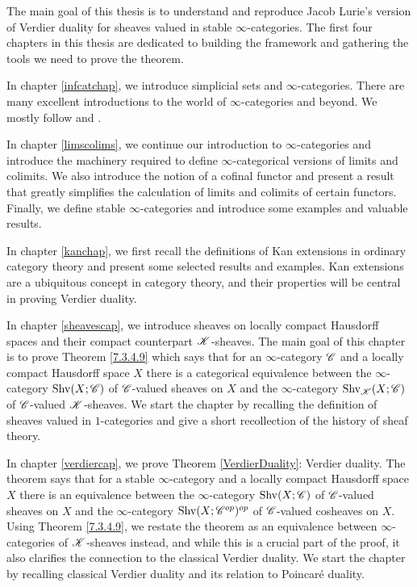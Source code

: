 \documentclass[../../thesis.tex]{subfiles}
\begin{document}
The main goal of this thesis is to understand and reproduce Jacob Lurie's version of Verdier duality for sheaves valued in stable $\infty$-categories.
The first four chapters in this thesis are dedicated to building the framework and gathering the tools we need to prove the theorem.


In chapter \ref{infcatchap}, we introduce simplicial sets and $\infty$-categories.
There are many excellent introductions to the world of $\infty$-categories and beyond.
We mostly follow \cite{kerodon} and \cite{Rezk}.


In chapter \ref{limscolims}, we continue our introduction to $\infty$-categories and introduce the machinery required to define $\infty$-categorical versions of limits and colimits.
We also introduce the notion of a cofinal functor and present a result that greatly simplifies the calculation of limits and colimits of certain functors.
Finally, we define stable $\infty$-categories and introduce some examples and valuable results.


In chapter \ref{kanchap}, we first recall the definitions of Kan extensions in ordinary category theory and present some selected results and examples.
Kan extensions are a ubiquitous concept in category theory, and their properties will be central in proving Verdier duality.


In chapter \ref{sheavescap}, we introduce sheaves on locally compact Hausdorff spaces and their compact counterpart $\mathscr{K}$-sheaves.
The main goal of this chapter is to prove Theorem \ref{7.3.4.9} which says that for an $\infty$-category $\mathscr{C}$ and a locally compact Hausdorff space $X$ there is a categorical equivalence between the $\infty$-category $\mathrm{Shv}(X;\mathscr{C})$ of $\mathscr{C}$-valued sheaves on $X$ and the $\infty$-category $\mathrm{Shv}_{\mathscr{K}}(X;\mathscr{C})$ of $\mathscr{C}$-valued $\mathscr{K}$-sheaves.
We start the chapter by recalling the definition of sheaves valued in $1$-categories and give a short recollection of the history of sheaf theory.

In chapter \ref{verdiercap}, we prove Theorem \ref{VerdierDuality}: Verdier duality.
The theorem says that for a stable $\infty$-category and a locally compact Hausdorff space $X$ there is an equivalence between the $\infty$-category $\mathrm{Shv}(X;\mathscr{C})$ of $\mathscr{C}$-valued sheaves on $X$ and the $\infty$-category $\mathrm{Shv}(X;\mathscr{C}^{op})^{op}$ of $\mathscr{C}$-valued cosheaves on $X$.
Using Theorem \ref{7.3.4.9}, we restate the theorem as an equivalence between $\infty$-categories of $\mathscr{K}$-sheaves instead, and while this is a crucial part of the proof, it also clarifies the connection to the classical Verdier duality.
We start the chapter by recalling classical Verdier duality and its relation to Poincaré duality.
\end{document}
